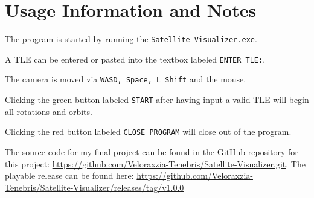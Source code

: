 \documentclass[conference]{IEEEtran}
\begin{document}
	\section*{Usage Information and Notes}
		The program is started by running the \texttt{Satellite Visualizer.exe}.

		A TLE can be entered or pasted into the textbox labeled \texttt{ENTER TLE:}.

		The camera is moved via \texttt{WASD, Space, L Shift} and the mouse.

		Clicking the green button labeled \texttt{START} after having input a valid TLE will begin all rotations and orbits.

		Clicking the red button labeled \texttt{CLOSE PROGRAM} will close out of the program.

		The source code for my final project can be found in the GitHub repository for this project: \url{https://github.com/Veloraxzia-Tenebris/Satellite-Visualizer.git}. The playable release can be found here: \url{https://github.com/Veloraxzia-Tenebris/Satellite-Visualizer/releases/tag/v1.0.0}
\end{document}

